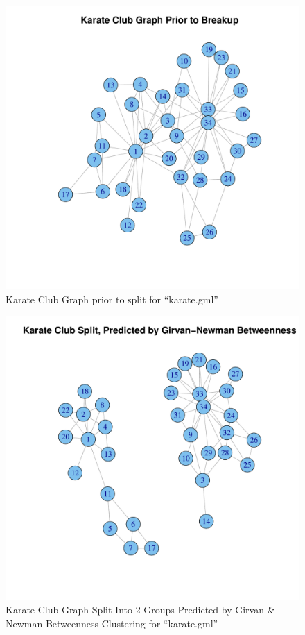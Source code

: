 \begin{figure}[h]
\includegraphics[scale=0.6]{R/kclub-gml.pdf}
\caption{Karate Club Graph prior to split for ``karate.gml''}
\label{fig:before-split}
\end{figure}

\begin{figure}[h]
\includegraphics[scale=0.6]{R/kclub-gml-afterSplit.pdf}
\caption{Karate Club Graph Split Into 2 Groups Predicted by Girvan \& Newman Betweenness Clustering for ``karate.gml''}
\label{fig:after-split}
\end{figure}

